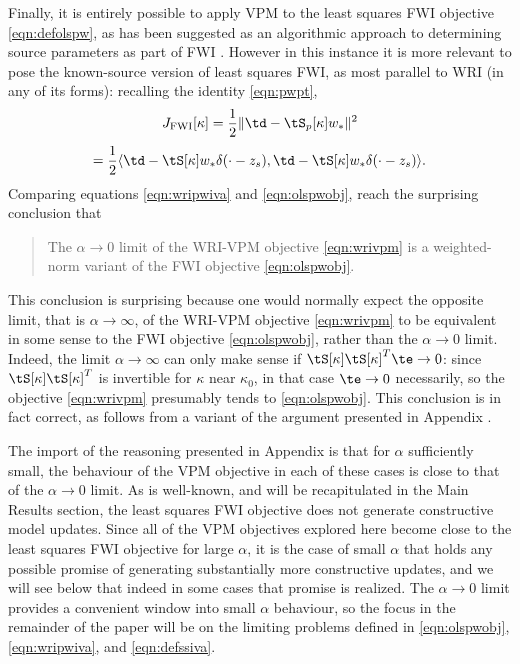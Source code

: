 Finally, it is entirely possible to apply VPM to the least squares FWI
objective \ref{eqn:defolspw}, as has been suggested as an algorithmic
approach to determining source parameters as part of FWI
\cite{Rickett:SEG12,LiRickettAbubakar:13}. However in this instance it
is more relevant to pose the known-source version of least squares
FWI, as most parallel to WRI (in any of its forms): recalling the
identity \ref{eqn:pwpt}, 
\[
  J_{\rm FWI}[\kappa] = \frac{1}{2}\|\td-\tS_p[\kappa]w_*\|^2 
\]
\begin{equation}
  \label{eqn:olspwobj}
  = \frac{1}{2}\langle \td -
  \tS[\kappa]w_*\delta(\cdot-z_s), \td -
  \tS[\kappa]w_*\delta(\cdot-z_s)\rangle.
\end{equation}
Comparing equations \ref{eqn:wripwiva} and \ref{eqn:olspwobj}, reach
the surprising conclusion that
\begin{quote}
  The $\alpha \rightarrow 0$ limit of the WRI-VPM objective
  \ref{eqn:wrivpm} is a weighted-norm variant of the FWI objective
  \ref{eqn:olspwobj}.
\end{quote}
This conclusion is surprising because one would normally expect the
opposite limit, that is $\alpha \rightarrow \infty$, of the WRI-VPM
objective \ref{eqn:wrivpm} to be equivalent in some sense to the FWI
objective \ref{eqn:olspwobj}, rather than the $\alpha \rightarrow 0$
limit. Indeed, the limit $\alpha \rightarrow \infty$ can only make
sense if $\tS[\kappa]\tS[\kappa]^T\te \rightarrow 0$: since
$\tS[\kappa]\tS[\kappa]^T$ is invertible for $\kappa$ near $\kappa_0$,
in that case $\te \rightarrow 0$ necessarily, so the objective
\ref{eqn:wrivpm} presumably tends to \ref{eqn:olspwobj}. This conclusion
is in fact correct, as follows from a variant of the argument
presented in Appendix \appIVA.

The import of the reasoning presented in Appendix \appIVA is that for
$\alpha$ sufficiently small, the behaviour of the VPM objective in
each of these cases is close to that of the $\alpha \rightarrow 0$
limit. As is well-known, and will be recapitulated in the Main Results
section, the least squares FWI objective does not generate
constructive model updates. Since all of the VPM objectives explored
here become close to the least squares FWI objective for large
$\alpha$, it is the case of small $\alpha$ that holds any possible
promise of generating substantially more constructive updates, and we
will see below that indeed in some cases that promise is realized. The
$\alpha \rightarrow 0$ limit provides a convenient window into
small $\alpha$ behaviour, so the focus in the remainder of the paper
will be on the limiting problems defined in \ref{eqn:olspwobj},
\ref{eqn:wripwiva}, and \ref{eqn:defssiva}.

